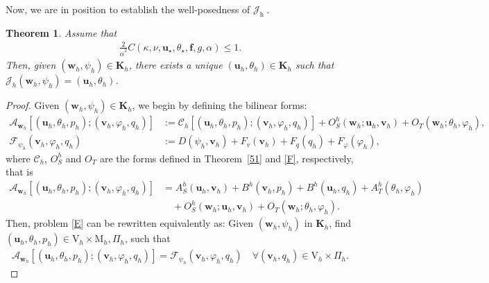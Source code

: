 \documentclass[10pt,a4paper]{article}
\newtheorem{theorem} {\bf Theorem}
\begin{document}
Now, we are in position to establish the well-posedness of $\mathcal{J}_{\text {h }}$.
  		\begin{theorem}\label{qa7}
  			Assume that
  			\begin{align}\label{53}
  			\frac{2}{\hat{\alpha}^2} C(\kappa, \nu, \boldsymbol{u}_{\star}, \theta_{\star}, \boldsymbol{f}, g, \alpha) \leq 1.
  			\end{align}
  			Then, given $(\boldsymbol{w}_h, \psi_h) \in \boldsymbol{K}_h$, there exists a unique $(\boldsymbol{u}_h, \theta_h) \in \boldsymbol{K}_h$ such that $\mathcal{J}_h\left(\boldsymbol{w}_h, \psi_h \right)=(\boldsymbol{u}_h, \theta_h)$.	
  		\end{theorem} 
  		\begin{proof}
  			Given $ (\boldsymbol{w}_h, \psi_h) \in \boldsymbol{K}_h$, we begin by defining the bilinear forms:
  			\begin{align*}
  			\mathcal{A}_{\boldsymbol{w}_h}\left[(\boldsymbol{u}_h,\theta_h, p_h);(\boldsymbol{v}_h,\varphi_h, q_h)\right]&:=\mathcal{C}_h\left[( \boldsymbol{u}_h, \theta_h,p_h);( \boldsymbol{v}_h, \varphi_h, q_h)\right]+ {O}_S^h(\boldsymbol{w}_h ; \boldsymbol{u}_h, \boldsymbol{v}_h) + O_T(\boldsymbol{w}_h; \theta_h, \varphi_h),
            \\ 
            \mathcal{F}_{\psi_h}(\boldsymbol{v}_h, \varphi_h, q_h) & := D(\psi_h,\boldsymbol{v}_h)+F_v(\boldsymbol{v}_h) + F_q(q_h) + F_{\varphi}(\varphi_h), 
  			\end{align*}
  			where $\mathcal{C}_h$, $O_S^h$ and $O_T$ are the forms defined in Theorem~\ref{51} and \eqref{F}, respectively, that is
  			\begin{align}\label{A_wh}
  			\mathcal{A}_{\boldsymbol{w}_h}\left[(\boldsymbol{u}_h,\theta_h,p_h);(\boldsymbol{v}_h,\varphi_h,q_h)\right]&={A}_S^h(\boldsymbol{u}_h, \boldsymbol{v}_h) + {B}^h(\boldsymbol{v}_h,p_h)  + {B}^h(\boldsymbol{u}_h, q_h) +  {A}^h_T(\theta_h,\varphi_h)  \nonumber \\ & \quad + {O}_S^h(\boldsymbol{w}_h ; \boldsymbol{u}_h, \boldsymbol{v}_h) + O_T(\boldsymbol{w}_h; \theta_h, \varphi_h).
  			\end{align}
  			Then, problem \eqref{E} can be rewritten equivalently as: Given $(\boldsymbol{w}_h,\psi_h)$ in $\boldsymbol{K}_h$, find $(\boldsymbol{u}_h, \theta_h, p_h) \in \mathrm{V}_h \times \mathrm{M}_h, \Pi_h$, such that
  			\begin{align}\label{32}
  			\mathcal{A}_{\boldsymbol{w}_h}\left[(\boldsymbol{u}_h, \theta_h, p_h);(\boldsymbol{v}_h, \varphi_h, q_h)\right]=\mathcal{F}_{\psi_h}(\boldsymbol{v}_h, \varphi_h, q_h) \quad \forall( \boldsymbol{v}_h,q_h) \in \mathrm{V}_h \times \Pi_h.

\end{align}
\end{proof}
\end{document}
